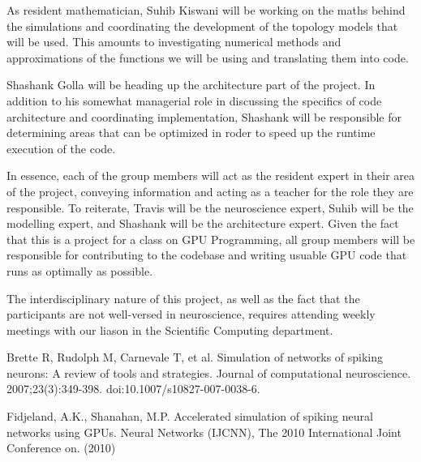 \documentclass[a4paper]{article}
\begin{document}
As resident mathematician, Suhib Kiswani will be working on the maths behind the simulations and coordinating the development of the topology models that will be used. This amounts to investigating numerical methods and approximations of the functions we will be using and translating them into code.

Shashank Golla will be heading up the architecture part of the project. In addition to his somewhat managerial role in discussing the specifics of code architecture and coordinating implementation, Shashank will be responsible for determining areas that can be optimized in roder to speed up the runtime execution of the code.

In essence, each of the group members will act as the resident expert in their area of the project, conveying information and acting as a teacher for the role they are responsible. To reiterate, Travis will be the neuroscience expert, Suhib will be the modelling expert, and Shashank will be the architecture expert. Given the fact that this is a project for a class on GPU Programming, all group members will be responsible for contributing to the codebase and writing usuable GPU code that runs as optimally as possible.

The interdisciplinary nature of this project, as well as the fact that the participants are not well-versed in neuroscience, requires attending weekly meetings with our liason in the Scientific Computing department.

\begin{thebibliography}{9}

Brette R, Rudolph M, Carnevale T, et al. Simulation of networks of spiking neurons: A review of tools and strategies. Journal of computational neuroscience. 2007;23(3):349-398. doi:10.1007/s10827-007-0038-6.

 Fidjeland, A.K.,  Shanahan, M.P.
Accelerated simulation of spiking neural networks using GPUs. Neural Networks (IJCNN), The 2010 International Joint Conference on. (2010)


\end{thebibliography}

\end{document}
